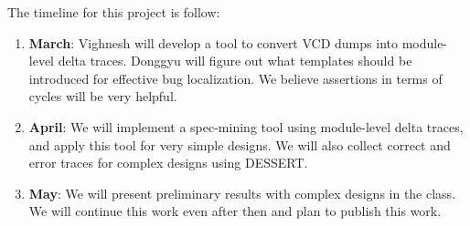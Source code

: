 \documentclass[11pt]{article}
\begin{document}
The timeline for this project is follow:
\begin{enumerate}
  \item \textbf{March}: Vighnesh will develop a tool to convert VCD dumps into module-level delta traces. Donggyu will figure out what templates should be introduced for effective bug localization. We believe assertions in terms of cycles will be very helpful.
  \item \textbf{April}: We will implement a spec-mining tool using module-level delta traces, and apply this tool for very simple designs. We will also collect correct and error traces for complex designs using DESSERT.
  \item \textbf{May}: We will present preliminary results with complex designs in the class. We will continue this work even after then and plan to publish this work.
\end{enumerate}

\printbibliography
\end{document}
